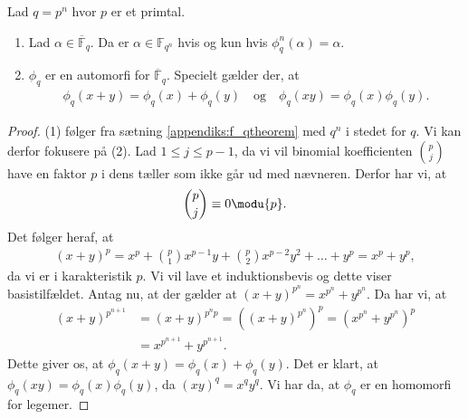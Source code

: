 \begin{proposition}
Lad $q=p^n$ hvor $p$ er et primtal.
\begin{enumerate}
	\item Lad $\alpha \in \overline{\mathbb{F}}_q$. Da er $\alpha \in \mathbb{F}_{q^n}$ 
	hvis og kun hvis $\phi_{q}^{n}(\alpha) = \alpha$.
	\item $\phi_q$ er en automorfi for $\overline{\mathbb{F}}_q$. Specielt gælder der,
	at 
	\begin{align*}
		\phi_q (x+y) = \phi_q(x) + \phi_q(y) \quad \text{og} \quad \phi_q(xy) =
		 \phi_q(x)\phi_q(y).
	\end{align*}
\end{enumerate}
\end{proposition}
\begin{proof}
(1) følger fra sætning \ref{appendiks:f_qtheorem} med $q^n$ i stedet for $q$. Vi kan derfor fokusere på (2). Lad $1 \leq j \leq p-1$, da vi vil binomial koefficienten 
$\binom{p}{j}$ have en faktor $p$ i dens tæller som ikke går ud med nævneren. Derfor har vi, at 
\begin{align*}
	\binom{p}{j} \equiv 0 \modu{p}.
\end{align*}
Det følger heraf, at 
\begin{align*}
	(x + y)^p = x^p + \binom{p}{1}x^{p-1}y + \binom{p}{2}x^{p-2}y^2 + 
	\ldots + y^p = x^p + y^p,
\end{align*}
da vi er i karakteristik $p$. Vi vil lave et induktionsbevis og dette viser basistilfældet. Antag nu, at der gælder at $(x+y)^{p^n} = x^{p^n} + y^{p^n}$. Da har vi, at
\begin{align*}
	(x+y)^{p^{n+1}} &= (x+y)^{p^n p} = ((x+y)^{p^n})^p
	= (x^{p^n} + y^{p^n})^p \\
	&= x^{p^{n+1}} + y^{p^{n+1}}.
\end{align*}
Dette giver os, at $\phi_q(x+y) = \phi_q(x) + \phi_q(y)$. Det er klart, at 
$\phi_q(xy)=\phi_q(x) \phi_q(y)$, da $(xy)^q = x^q y^q$. Vi har da, at $\phi_q$ er en homomorfi for legemer.
\end{proof}



